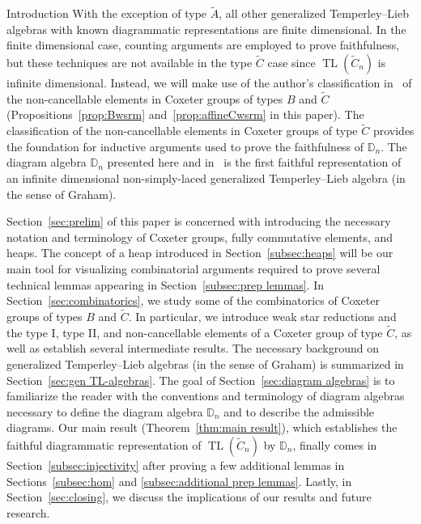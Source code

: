 \documentclass[11pt]{amsart}
\theoremstyle{definition}
\numberwithin{equation}{section}
\newcommand{\C}{\widetilde{C}}
\DeclareMathOperator{\TL}{TL}
\newcommand{\D}{\mathbb{D}}
\renewcommand{\(}{\left(}
\renewcommand{\)}{\right)}
\begin{document}
\begin{section}{Introduction}
With the exception of type $\widetilde{A}$, all other generalized Temperley--Lieb algebras with known diagrammatic representations are finite dimensional.  In the finite dimensional case, counting arguments are employed to prove faithfulness, but these techniques are not available in the type $\C$ case since $\TL(\C_n)$ is infinite dimensional.  Instead, we will make use of the author's classification in~\cite{Ernst2010} of the non-cancellable elements in Coxeter groups of types $B$ and $\C$ (Propositions~\ref{prop:Bwsrm} and~\ref{prop:affineCwsrm} in this paper).  The classification of the non-cancellable elements in Coxeter groups of type $\C$ provides the foundation for inductive arguments used to prove the faithfulness of $\D_n$.  The diagram algebra $\D_n$ presented here and in~\cite{Ernst2012} is the first faithful representation of an infinite dimensional non-simply-laced generalized Temperley--Lieb algebra (in the sense of Graham).

Section~\ref{sec:prelim} of this paper is concerned with introducing the necessary notation and terminology of Coxeter groups, fully commutative elements, and heaps.  The concept of a heap introduced in Section~\ref{subsec:heaps} will be our main tool for visualizing combinatorial arguments required to prove several technical lemmas appearing in Section~\ref{subsec:prep lemmas}.  In Section~\ref{sec:combinatorics}, we study some of the combinatorics of Coxeter groups of types $B$ and $\C$.  In particular, we introduce weak star reductions and the type I, type II, and non-cancellable elements of a Coxeter group of type $\C$, as well as establish several intermediate results.  The necessary background on generalized Temperley--Lieb algebras (in the sense of Graham) is summarized in Section~\ref{sec:gen TL-algebras}.  The goal of Section~\ref{sec:diagram algebras} is to familiarize the reader with the conventions and terminology of diagram algebras necessary to define the diagram algebra $\D_n$ and to describe the admissible diagrams.  Our main result (Theorem~\ref{thm:main result}), which establishes the faithful diagrammatic representation of $\TL(\C_n)$ by $\D_n$, finally comes in Section~\ref{subsec:injectivity} after proving a few additional lemmas in Sections~\ref{subsec:hom} and \ref{subsec:additional prep lemmas}.  Lastly, in Section~\ref{sec:closing}, we discuss the implications of our results and future research.

\end{section}

\end{document}
